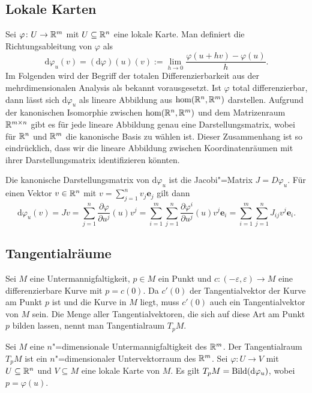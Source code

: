 \subsection{Lokale Karten}

Sei $\varphi\colon U\to\mathbb R^m$ mit $U\subseteq\mathbb R^n$ eine lokale Karte.
Man definiert die Richtungsableitung von $\varphi$ als
\begin{equation}
\mathrm d\varphi_u(v) = (\mathrm d\varphi)(u)(v)
:= \lim_{h\to 0}\frac{\varphi(u+hv)-\varphi(u)}{h}.
\end{equation}
Im Folgenden wird der Begriff der totalen Differenzierbarkeit
aus der mehrdimensionalen Analysis als bekannt vorausgesetzt.
Ist $\varphi$ total differenzierbar, dann lässt sich
$\mathrm d\varphi_u$ als lineare Abbildung aus $\hom(\mathbb R^n,\mathbb R^m)$
darstellen. Aufgrund der kanonischen Isomorphie zwischen
$\hom(\mathbb R^n,\mathbb R^m)$ und dem Matrizenraum $\mathbb R^{m\times n}$ gibt
es für jede lineare Abbildung genau eine Darstellungsmatrix,
wobei für $\mathbb R^n$ und $\mathbb R^m$ die kanonische Basis zu wählen ist.
Dieser Zusammenhang ist so eindrücklich, dass wir die lineare
Abbildung zwischen Koordinatenräumen mit ihrer Darstellungsmatrix
identifizieren könnten.

Die kanonische Darstellungsmatrix von $\mathrm d\varphi_u$ ist die
Jacobi"=Matrix $J=D\varphi_u$. Für einen Vektor $v\in\mathbb R^n$ mit
$v=\sum_{j=1}^n v_j \mathbf e_j$ gilt dann
\begin{equation}
\mathrm d\varphi_u(v) = Jv
= \sum_{j=1}^n \frac{\partial\varphi}{\partial u^j}(u) v^j
= \sum_{i=1}^m\sum_{j=1}^n \frac{\partial\varphi^i}{\partial u^j}(u) v^j\mathbf e_i
= \sum_{i=1}^m\sum_{j=1}^n J_{ij} v^j\mathbf e_i.
\end{equation}

\subsection{Tangentialräume}

Sei $M$ eine Untermannigfaltigkeit, $p\in M$ ein Punkt und
$c\colon (-\varepsilon,\varepsilon)\to M$ eine differenzierbare Kurve
mit $p=c(0)$. Da $c'(0)$ der Tangentialvektor der Kurve am Punkt $p$
ist und die Kurve in $M$ liegt, muss $c'(0)$ auch ein Tangentialvektor
von $M$ sein. Die Menge aller Tangentialvektoren, die sich auf
diese Art am Punkt $p$ bilden lassen, nennt man
Tangentialraum $T_p M$.

\begin{theorem}
Sei $M$ eine $n$"=dimensionale Untermannigfaltigkeit des $\mathbb R^m$.
Der Tangentialraum $T_p M$ ist ein $n$"=dimensionaler Untervektorraum
des $\mathbb R^m$. Sei $\varphi\colon U\to V$ mit $U\subseteq\mathbb R^n$ und
$V\subseteq M$ eine lokale Karte von $M$.  Es gilt
$T_p M = \operatorname{Bild}(\mathrm d\varphi_u)$, wobei $p=\varphi(u)$. 
\end{theorem}

